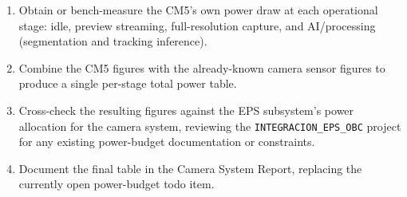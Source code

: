 \begin{enumerate}[leftmargin=*]
    \item Obtain or bench-measure the CM5's own power draw at each operational stage: idle, preview streaming, full-resolution capture, and AI/processing (segmentation and tracking inference).
    \item Combine the CM5 figures with the already-known camera sensor figures to produce a single per-stage total power table.
    \item Cross-check the resulting figures against the EPS subsystem's power allocation for the camera system, reviewing the \texttt{INTEGRACION\_EPS\_OBC} project for any existing power-budget documentation or constraints.
    \item Document the final table in the Camera System Report, replacing the currently open power-budget todo item.
\end{enumerate}
